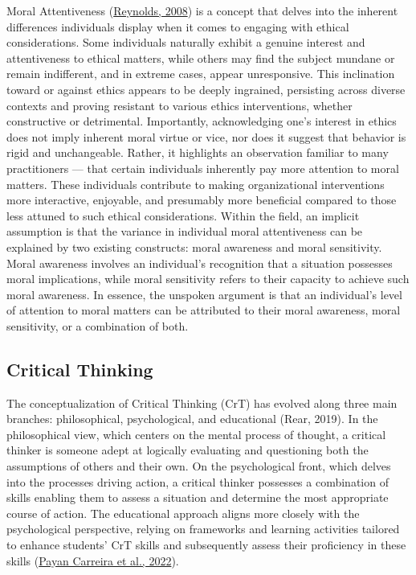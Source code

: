 \documentclass[
  12pt,
  a4paper,
  twoside]{article}
\begin{document}
Moral Attentiveness (\protect\hyperlink{ref-reynolds2008}{Reynolds, 2008}) is a concept that delves into the inherent differences individuals display when it comes to engaging with ethical considerations. Some individuals naturally exhibit a genuine interest and attentiveness to ethical matters, while others may find the subject mundane or remain indifferent, and in extreme cases, appear unresponsive. This inclination toward or against ethics appears to be deeply ingrained, persisting across diverse contexts and proving resistant to various ethics interventions, whether constructive or detrimental.
Importantly, acknowledging one's interest in ethics does not imply inherent moral virtue or vice, nor does it suggest that behavior is rigid and unchangeable. Rather, it highlights an observation familiar to many practitioners --- that certain individuals inherently pay more attention to moral matters. These individuals contribute to making organizational interventions more interactive, enjoyable, and presumably more beneficial compared to those less attuned to such ethical considerations.
Within the field, an implicit assumption is that the variance in individual moral attentiveness can be explained by two existing constructs: moral awareness and moral sensitivity. Moral awareness involves an individual's recognition that a situation possesses moral implications, while moral sensitivity refers to their capacity to achieve such moral awareness. In essence, the unspoken argument is that an individual's level of attention to moral matters can be attributed to their moral awareness, moral sensitivity, or a combination of both.

\hypertarget{critical-thinking}{%
\subsection{Critical Thinking}\label{critical-thinking}}

The conceptualization of Critical Thinking (CrT) has evolved along three main branches: philosophical, psychological, and educational (Rear, 2019). In the philosophical view, which centers on the mental process of thought, a critical thinker is someone adept at logically evaluating and questioning both the assumptions of others and their own. On the psychological front, which delves into the processes driving action, a critical thinker possesses a combination of skills enabling them to assess a situation and determine the most appropriate course of action. The educational approach aligns more closely with the psychological perspective, relying on frameworks and learning activities tailored to enhance students' CrT skills and subsequently assess their proficiency in these skills (\protect\hyperlink{ref-payan2022}{Payan Carreira et al., 2022}).
\end{document}

